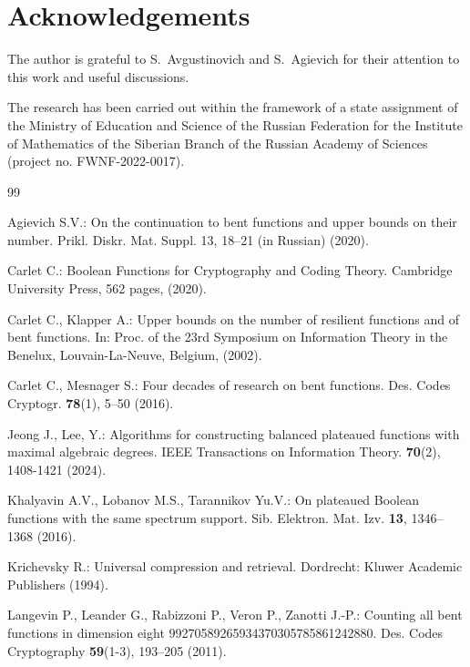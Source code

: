 \documentclass[a4paper,12pt]{article}   %
\begin{document}
\section*{Acknowledgements}


The author is grateful to S.~Avgustinovich and S.~Agievich for their
attention to this work and  useful discussions.

The research  has been carried out within the framework of a state
assignment of the Ministry of Education and Science of the Russian
Federation for the Institute of Mathematics of the Siberian Branch
of the Russian Academy of Sciences (project no. FWNF-2022-0017).




\begin{thebibliography}{99}


 Agievich S.V.: On the continuation to bent functions and upper
bounds on their number. Prikl. Diskr. Mat. Suppl. 13, 18--21
 (in Russian) (2020).



  Carlet C.: Boolean Functions for Cryptography and Coding Theory.
  Cambridge University Press, 562 pages, (2020).


Carlet C., Klapper A.: Upper bounds on the number of resilient
functions and of bent
 functions. In: Proc. of the 23rd Symposium on Information Theory
 in the Benelux, Louvain-La-Neuve, Belgium, (2002).


Carlet C.,  Mesnager S.: Four decades of research on bent functions.
Des. Codes Cryptogr. {\bf 78}(1), 5--50 (2016).

Jeong J.,  Lee, Y.:  Algorithms for constructing balanced plateaued
functions with maximal algebraic degrees. IEEE Transactions on
Information Theory. {\bf 70}(2), 1408-1421 (2024).



Khalyavin A.V., Lobanov M.S.,  Tarannikov Yu.V.: On plateaued
Boolean functions with the same spectrum support.  Sib. Elektron.
Mat. Izv. {\bf 13}, 1346--1368 (2016).





Krichevsky R.: Universal compression and retrieval. Dordrecht:
Kluwer Academic Publishers (1994).


Langevin P., Leander G., Rabizzoni P., Veron P.,  Zanotti  J.-P.:
Counting all bent functions in dimension eight
99270589265934370305785861242880.  Des. Codes Cryptography {\bf
59}(1-3),  193--205  (2011).


\end{thebibliography}
\end{document}
